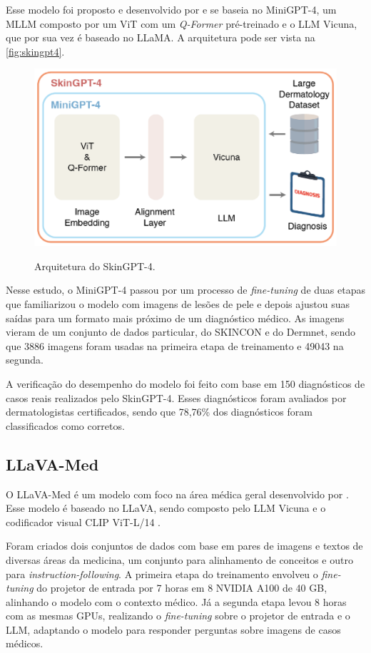 Esse modelo foi proposto e desenvolvido por \textcite{zhou2023skingpt} e se baseia no Mini\ac{GPT}-4, um \ac{MLLM}
composto por um \ac{ViT} com um \textit{Q-Former} pré-treinado e o \ac{LLM} Vicuna, que por sua vez é baseado no
\ac{LLaMA}. A arquitetura pode ser vista na \autoref{fig:skingpt4}.

\begin{figure}[ht]
    \centering
    \caption{\small Arquitetura do Skin\ac{GPT}-4.}
    \includegraphics[width=0.55\columnwidth,keepaspectratio]{images/skingpt4.png}
    \label{fig:skingpt4}
\end{figure}

Nesse estudo, o Mini\ac{GPT}-4 passou por um processo de \textit{fine-tuning} de duas etapas que familiarizou o modelo
com imagens de lesões de pele e depois ajustou suas saídas para um formato mais próximo de um diagnóstico médico. As
imagens vieram de um conjunto de dados particular, do SKINCON e do Dermnet, sendo que 3886 imagens foram usadas na
primeira etapa de treinamento e 49043 na segunda.

A verificação do desempenho do modelo foi feito com base em 150 diagnósticos de casos reais realizados pelo
Skin\ac{GPT}-4. Esses diagnósticos foram avaliados por dermatologistas certificados, sendo que 78,76\% dos diagnósticos
foram classificados como corretos.

\subsection{LLaVA-Med}

O \ac{LLaVA}-Med é um modelo com foco na área médica geral desenvolvido por \textcite{li2024llava}. Esse modelo é
baseado no \ac{LLaVA}, sendo composto pelo \ac{LLM} Vicuna e o codificador visual \ac{CLIP} \ac{ViT}-L/14
\cite{liu2024visual}.

Foram criados dois conjuntos de dados com base em pares de imagens e textos de diversas áreas da medicina, um conjunto
para alinhamento de conceitos e outro para \textit{instruction-following}. A primeira etapa do treinamento envolveu o
\textit{fine-tuning} do projetor de entrada por 7 horas em 8 NVIDIA A100 de 40 GB, alinhando o modelo com o contexto
médico. Já a segunda etapa levou 8 horas com as mesmas GPUs, realizando o \textit{fine-tuning} sobre o projetor de
entrada e o \ac{LLM}, adaptando o modelo para responder perguntas sobre imagens de casos médicos.

